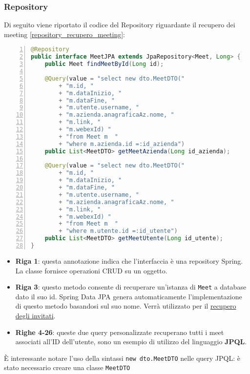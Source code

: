 \subsubsection{Repository}
Di seguito viene riportato il codice del Repository riguardante il recupero dei meeting \ref{repository_recupero_meeting}: 
\begin{lstlisting}[language=java, frame=lines, basicstyle=\ttfamily\scriptsize, numbers=left, 
    label={repository_recupero_meeting}, caption={repository recupero meeting}]
@Repository
public interface MeetJPA extends JpaRepository<Meet, Long> {
    public Meet findMeetById(Long id);

    @Query(value = "select new dto.MeetDTO("
        + "m.id, "
        + "m.dataInizio, "
        + "m.dataFine, "
        + "m.utente.username, "
        + "m.azienda.anagraficaAz.nome, "
        + "m.link, "
        + "m.webexId) "
        + "from Meet m  "
        + "where m.azienda.id =:id_azienda")
    public List<MeetDTO> getMeetAzienda(Long id_azienda);
    
    @Query(value = "select new dto.MeetDTO("
        + "m.id, "
        + "m.dataInizio, "
        + "m.dataFine, "
        + "m.utente.username, "
        + "m.azienda.anagraficaAz.nome, "
        + "m.link, "
        + "m.webexId) "
        + "from Meet m  "
        + "where m.utente.id =:id_utente")
    public List<MeetDTO> getMeetUtente(Long id_utente);
}
\end{lstlisting}
\begin{itemize}
    \item \textbf{Riga 1}: questa annotazione indica che l'interfaccia è una repository Spring. La classe fornisce operazioni CRUD su un oggetto. 
    \cite{RepositorySpring}

    \item \textbf{Riga 3}: questo metodo consente di recuperare un'istanza di \texttt{Meet} a database dato il suo id. Spring Data JPA
    genera automaticamente l'implementazione di questo metodo basandosi sul suo nome. Verrà utilizzato per il 
    \hyperref[sec:recupero_invitati_backend]{recupero degli invitati}.

    \item \textbf{Righe 4-26}: queste due query personalizzate recuperano tutti i meet associati all'ID dell'utente, sono un esempio di utilizzo
    del linguaggio \textbf{JPQL}. 
\end{itemize}
È interessante notare l'uso della sintassi \texttt{new dto.MeetDTO} nelle query JPQL: è stato necessario creare una classe \texttt{MeetDTO} 
